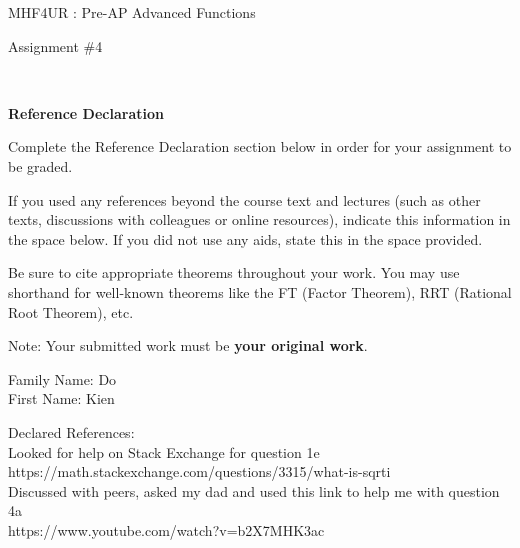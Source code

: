 \documentclass[12pt]{book}
\begin{document}
\vspace{-1.0in}\begin{center}
\Large{MHF4UR : Pre-AP Advanced Functions }

\Large{Assignment \#4}


\end{center}


\vspace{0.015in}\hrulefill\ 

\textbf{Reference Declaration} %

Complete the Reference Declaration section below in order for your assignment to be graded.

If you used any references beyond the course text and lectures (such as other texts, discussions with colleagues or online resources), indicate this information in the space below.  If you did not use any aids, state this in the space provided. 

Be sure to cite appropriate theorems throughout your work. You may use shorthand for well-known theorems like the FT (Factor Theorem), RRT (Rational Root Theorem), etc. 

Note: Your submitted work must be \textbf{your original work}. 

Family Name: Do\\%
First Name: Kien%

Declared References: \\
Looked for help on Stack Exchange for question 1e\\ https://math.stackexchange.com/questions/3315/what-is-sqrti \\

Discussed with peers, asked my dad and used this link to help me with question 4a\\
https://www.youtube.com/watch?v=b2X7MHK\textunderscore3ac


\vspace{0.015in}\hrulefill\ 

\newpage

\end{document}
